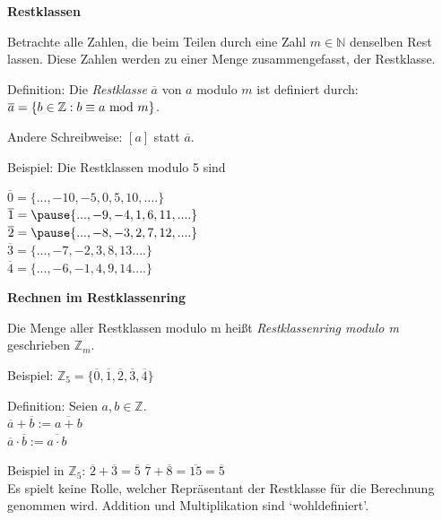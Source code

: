 \begin{frame}[fragile]
\textbf{Restklassen} 

Betrachte alle Zahlen, die beim Teilen durch eine Zahl $m \in \mathbb{N}$ denselben Rest lassen. Diese Zahlen werden zu einer
Menge zusammengefasst, der Restklasse. \pause

Definition: Die \textit{Restklasse} $\overline{a}$ von $a$ modulo $m$ ist definiert durch: \\
$\overline{a} = \{b \in \mathbb{Z}: b\equiv a\text{ mod }m\}$. \pause

Andere Schreibweise: $[a]$ statt $\overline{a}$. \pause

Beispiel: Die Restklassen modulo 5 sind

$\overline{0} = \{ ..., -10, -5, 0, 5, 10, ....\}$ \\
$\overline{1} = \pause \{ ..., -9, -4, 1, 6, 11, ....\}$ \\
$\overline{2} = \pause  \{ ..., -8, -3, 2, 7, 12, ....\}$ \\
$\overline{3} = \{ ..., -7, -2, 3, 8, 13 ....\}$ \\
$\overline{4} = \{ ..., -6, -1, 4, 9, 14 ....\}$ \\

\end{frame}
 
\begin{frame}[fragile]

\textbf{Rechnen im Restklassenring}

Die Menge aller Restklassen modulo m heißt \textit{Restklassenring modulo m} geschrieben  $\mathbb{Z}_m$. \pause

Beispiel:  $\mathbb{Z}_5 =\{ \overline{0}, \overline{1}, \overline{2},\overline{3}, \overline{4} \} $ \pause

Definition: Seien $a,b \in \mathbb{Z}$. \\
$\overline{a} + \overline{b} := \overline{a+b}$ \\
$\overline{a} \cdot \overline{b} := \overline{a \cdot b}$  \pause

Beispiel in  $\mathbb{Z}_5$: $\overline{2} + \overline{3} = \overline{5}$ 
\quad $\overline{7} + \overline{8} = \overline{15} = \overline{5}$\\ \pause
Es spielt keine Rolle, welcher Repräsentant der Restklasse für die Berechnung genommen wird. Addition und Multiplikation sind  `wohldefiniert'.

\end{frame}


